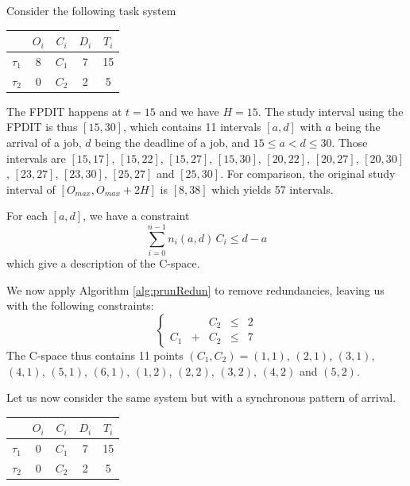 \documentclass[conference]{IEEEtran}
\begin{document}
Consider the following task system

    \begin{center}
    \begin{tabular}{|r|c|c|c|c|}
     \hline
      & $O_i$ & $C_i$ & $D_i$ & $T_i$ \\
     \hline
     $\tau_1$ & 8 & $C_1$ & 7 & 15\\
     \hline
     $\tau_2$ & 0 & $C_2$ & 2 & 5\\
     \hline
    \end{tabular}
    \end{center}

The FPDIT happens at $t=15$ and we have $H = 15$. The study interval using the FPDIT is thus $[15, 30]$, which contains 11 intervals $[a,d]$ with $a$ being the arrival of a job, $d$ being the deadline of a job, and $15 \leqslant a < d \leqslant 30$. Those intervals are
$[15, 17]$, $[15, 22]$, $[15, 27]$, $[15, 30]$, $[20, 22]$, $[20, 27]$, $[20, 30]$, $[23, 27]$, $[23, 30]$, $[25, 27]$ and $[25, 30]$. For comparison, the original study interval of $[O_{max}, O_{max} + 2H]$ is $[8, 38]$ which yields 57 intervals.

For each $[a, d]$, we have a constraint $$\sum_{i=0}^{n-1} n_i(a, d) \, C_i \leqslant d - a$$ which give a description of the C-space.

We now apply Algorithm \ref{alg:prunRedun} to remove redundancies, leaving us with the following constraints:
$$
\left\{
  \begin{array}{ccccc}
    & & C_2 & \leqslant & 2 \\
    C_1 & + & C_2 & \leqslant & 7
  \end{array}
\right.
$$
The C-space thus contains 11 points $(C_1, C_2) = (1, 1)$, $(2, 1)$, $(3, 1)$, $(4, 1)$, $(5, 1)$, $(6, 1)$, $(1, 2)$, $(2, 2)$, $(3, 2)$, $(4, 2)$ and $(5, 2)$.

Let us now consider the same system but with a synchronous pattern of arrival.

    \begin{center}
    \begin{tabular}{|r|c|c|c|c|}
     \hline
      & $O_i$ & $C_i$ & $D_i$ & $T_i$ \\
     \hline
     $\tau_1$ & 0 & $C_1$ & 7 & 15\\
     \hline
     $\tau_2$ & 0 & $C_2$ & 2 & 5\\
     \hline
    \end{tabular}
    \end{center}
\end{document}
